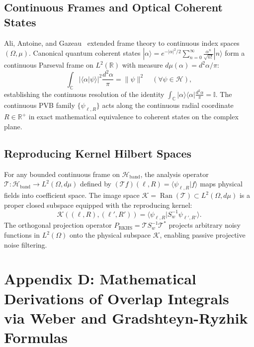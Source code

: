 \documentclass{optica-article}
\begin{document}
\subsection{Continuous Frames and Optical Coherent States}

Ali, Antoine, and Gazeau~\cite{Ali1993,Gazeau2009,Klauder1985,Perelomov1986} extended frame theory to continuous index spaces $(\Omega, \mu)$. Canonical quantum coherent states $|\alpha\rangle = e^{-|\alpha|^2/2} \sum_{n=0}^\infty \frac{\alpha^n}{\sqrt{{n}!}} |n\rangle$ form a continuous Parseval frame on $L^2(\mathbb{R})$ with measure $d\mu(\alpha) = d^2\alpha / \pi$:
\begin{equation}
\int_\mathbb{C} |\langle \alpha | \psi \rangle|^2 \frac{d^2\alpha}{\pi} = \|\psi\|^2 \quad (\forall \psi \in \mathcal{H}),
\label{eq:app_coherent_parseval}
\end{equation}
establishing the continuous resolution of the identity $\int_\mathbb{C} |\alpha\rangle \langle \alpha| \frac{d^2\alpha}{\pi} = \mathbb{I}$. The continuous PVB family $\{\psi_{\ell, R}\}$ acts along the continuous radial coordinate $R \in \mathbb{R}^+$ in exact mathematical equivalence to coherent states on the complex plane.

\subsection{Reproducing Kernel Hilbert Spaces}

For any bounded continuous frame on $\mathcal{H}_{\text{band}}$, the analysis operator $\mathcal{T}: \mathcal{H}_{\text{band}} \to L^2(\Omega, d\mu)$ defined by $(\mathcal{T} f)(\ell, R) = \langle \psi_{\ell, R} | f \rangle$ maps physical fields into coefficient space. The image space $\mathcal{K} = \operatorname{Ran}(\mathcal{T}) \subset L^2(\Omega, d\mu)$ is a proper closed subspace equipped with the reproducing kernel:
\begin{equation}
\mathcal{K}((\ell, R), (\ell', R')) = \langle \psi_{\ell, R} | S_w^{-1} \psi_{\ell', R'} \rangle.
\label{eq:app_reproducing_kernel}
\end{equation}
The orthogonal projection operator $P_{\text{RKHS}} = \mathcal{T} S_w^{-1} \mathcal{T}^*$ projects arbitrary noisy functions in $L^2(\Omega)$ onto the physical subspace $\mathcal{K}$, enabling passive projective noise filtering.

\section{Appendix D: Mathematical Derivations of Overlap Integrals via Weber and Gradshteyn-Ryzhik Formulas}
\label{app:weber_proofs}
\end{document}
